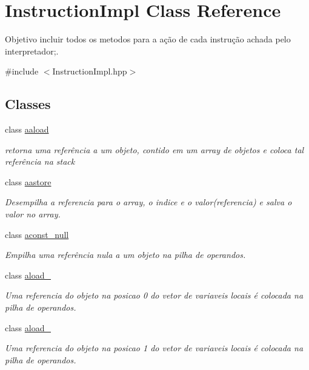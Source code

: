 \hypertarget{class_instruction_impl}{}\section{Instruction\+Impl Class Reference}
\label{class_instruction_impl}


Objetivo incluir todos os metodos para a ação de cada instrução achada pelo interpretador;.  




{\ttfamily \#include $<$Instruction\+Impl.\+hpp$>$}

\subsection*{Classes}
\begin{DoxyCompactItemize}
\item 
class \hyperlink{class_instruction_impl_1_1aaload}{aaload}
\begin{DoxyCompactList}\small\item\em retorna uma referência a um objeto, contido em um array de objetos e coloca tal referência na stack \end{DoxyCompactList}\item 
class \hyperlink{class_instruction_impl_1_1aastore}{aastore}
\begin{DoxyCompactList}\small\item\em Desempilha a referencia para o array, o indice e o valor(referencia) e salva o valor no array. \end{DoxyCompactList}\item 
class \hyperlink{class_instruction_impl_1_1aconst__null}{aconst\+\_\+null}
\begin{DoxyCompactList}\small\item\em Empilha uma referência nula a um objeto na pilha de operandos. \end{DoxyCompactList}\item 
class \hyperlink{class_instruction_impl_1_1aload__0}{aload\+\_}
\begin{DoxyCompactList}\small\item\em Uma referencia do objeto na posicao 0 do vetor de variaveis locais é colocada na pilha de operandos. \end{DoxyCompactList}\item 
class \hyperlink{class_instruction_impl_1_1aload__1}{aload\+\_}
\begin{DoxyCompactList}\small\item\em Uma referencia do objeto na posicao 1 do vetor de variaveis locais é colocada na pilha de operandos. \end{DoxyCompactList}\item 

\end{DoxyCompactItemize}
